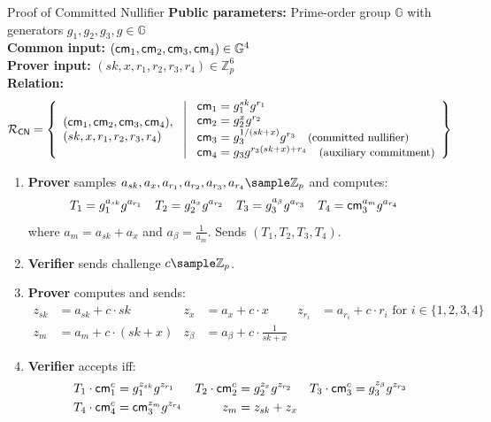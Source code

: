 \begin{protocol}{Proof of Committed Nullifier}{}
\label{prot:committed-nullifier}
\textbf{Public parameters:} Prime-order group $\mathbb{G}$ with generators $g_1, g_2, g_3, g \in \mathbb{G}$\\
\textbf{Common input:} $(\mathsf{cm}_1, \mathsf{cm}_2, \mathsf{cm}_3, \mathsf{cm}_4) \in \mathbb{G}^4$\\
\textbf{Prover input:} $(sk, x, r_1, r_2, r_3, r_4) \in \mathbb{Z}_p^6$  \\
\textbf{Relation:} 
\[
\mathcal{R}_{\mathsf{CN}} = \left\{ 
\begin{array}{l} 
(\mathsf{cm}_1, \mathsf{cm}_2, \mathsf{cm}_3, \mathsf{cm}_4), \\
(sk, x, r_1, r_2, r_3, r_4) 
\end{array}
\ \middle| \
\begin{array}{l}
\mathsf{cm}_1 = g_1^{sk} g^{r_1} \\
\mathsf{cm}_2 = g_2^{x} g^{r_2} \\
\mathsf{cm}_3 = g_3^{1/(sk + x)} g^{r_3}  \quad \text{\small{(committed nullifier)}}\\
\mathsf{cm}_4 = g_3 g^{r_3 (sk + x) + r_4}  \quad \text{\small{(auxiliary commitment)}}
\end{array} \right\}
\]
\begin{enumerate}
    \item \textbf{Prover} samples $a_{sk}, a_x, a_{r_1}, a_{r_2}, a_{r_3}, a_{r_4} \sample \mathbb{Z}_p$ and computes:
    \begin{align*}
        T_1 &= g_1^{a_{sk}} g^{a_{r_1}} & T_2 &= g_2^{a_x} g^{a_{r_2}} &
        T_3 &= g_3^{a_{\beta}} g^{a_{r_3}} & T_4 &= \mathsf{cm}_3^{a_m} g^{a_{r_4}}
    \end{align*}
    where $a_m = a_{sk} + a_x$ and $a_{\beta} = \frac{1}{a_m}$. Sends $(T_1, T_2, T_3, T_4)$.
    
    \item \textbf{Verifier} sends challenge $c \sample \mathbb{Z}_p$.
    
    \item \textbf{Prover} computes and sends:
    \begin{align*}
        z_{sk} &= a_{sk} + c \cdot sk & z_x &= a_x + c \cdot x &  z_{r_i} &= a_{r_i} + c \cdot r_i \text{ for } i \in \{1,2,3,4\} \\
        z_m &= a_m + c \cdot (sk + x) & z_{\beta} &= a_{\beta} + c \cdot \frac{1}{sk + x}
    \end{align*}
    
    \item \textbf{Verifier} accepts iff:
    \begin{align*}
        T_1 \cdot \mathsf{cm}_1^c &= g_1^{z_{sk}} g^{z_{r_1}} 
        & 
        T_2 \cdot \mathsf{cm}_2^c &= g_2^{z_x} g^{z_{r_2}} 
        &
        T_3 \cdot \mathsf{cm}_3^c &= g_3^{z_{\beta}} g^{z_{r_3}} \\
        T_4 \cdot \mathsf{cm}_4^c &= \mathsf{cm}_3^{z_m} g^{z_{r_4}}
        &
        z_m &= z_{sk} + z_x
    \end{align*}
\end{enumerate}
\end{protocol}



